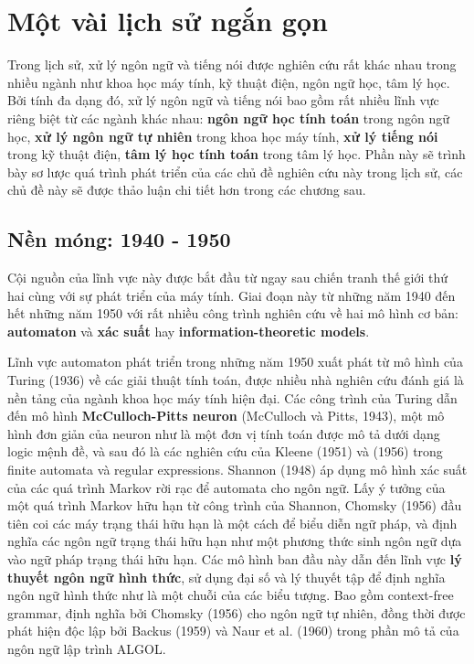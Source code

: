 \section{Một vài lịch sử ngắn gọn}

Trong lịch sử, xử lý ngôn ngữ và tiếng nói được nghiên cứu rất khác nhau trong nhiều ngành như khoa học máy tính, kỹ thuật điện, ngôn ngữ học, tâm lý học. Bởi tính đa dạng đó, xử lý ngôn ngữ và tiếng nói bao gồm rất nhiều lĩnh vực riêng biệt từ các ngành khác nhau: \textbf{ngôn ngữ học tính toán} trong ngôn ngữ học, \textbf{xử lý ngôn ngữ tự nhiên} trong khoa học máy tính, \textbf{xử lý tiếng nói} trong kỹ thuật điện, \textbf{tâm lý học tính toán} trong tâm lý học. Phần này sẽ trình bày sơ lược quá trình phát triển của các chủ đề nghiên cứu này trong lịch sử, các chủ đề này sẽ được thảo luận chi tiết hơn trong các chương sau.

\subsection{Nền móng: 1940 - 1950}

Cội nguồn của lĩnh vực này được bắt đầu từ ngay sau chiến tranh thế giới thứ hai cùng với sự phát triển của máy tính. Giai đoạn này từ những năm 1940 đến hết những năm 1950 với rất nhiều công trình nghiên cứu về hai mô hình cơ bản: \textbf{automaton} và \textbf{xác suất} hay \textbf{information-theoretic models}.

Lĩnh vực automaton phát triển trong những năm 1950 xuất phát từ mô hình của Turing (1936) về các giải thuật tính toán, được nhiều nhà nghiên cứu đánh giá là nền tảng của ngành khoa học máy tính hiện đại. Các công trình của Turing dẫn đến mô hình \textbf{McCulloch-Pitts neuron} (McCulloch và Pitts, 1943), một mô hình đơn giản của neuron như là một đơn vị tính toán được mô tả dưới dạng logic mệnh đề, và sau đó là các nghiên cứu của Kleene (1951) và (1956) trong finite automata và regular expressions. Shannon (1948) áp dụng mô hình xác suất của các quá trình Markov rời rạc để automata cho ngôn ngữ. Lấy ý tưởng của một quá trình Markov hữu hạn từ công trình của Shannon, Chomsky (1956) đầu tiên coi các máy trạng thái hữu hạn là một cách để biểu diễn ngữ pháp, và định nghĩa các ngôn ngữ trạng thái hữu hạn như một phương thức sinh ngôn ngữ dựa vào ngữ pháp trạng thái hữu hạn. Các mô hình ban đầu này dẫn đến lĩnh vực \textbf{lý thuyết ngôn ngữ hình thức}, sử dụng đại số và lý thuyết tập để định nghĩa ngôn ngữ hình thức như là một chuỗi của các biểu tượng. Bao gồm context-free grammar, định nghĩa bởi Chomsky (1956) cho ngôn ngữ tự nhiên, đồng thời được phát hiện độc lập bởi Backus (1959) và Naur et al. (1960) trong phần mô tả của ngôn ngữ lập trình ALGOL.

